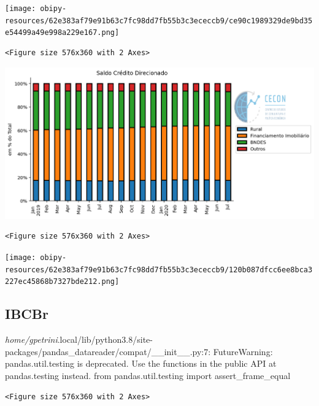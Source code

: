 \documentclass[11pt]{article}
\begin{document}
\begin{enumerate}
\begin{center}
\texttt{[image: obipy-resources/62e383af79e91b63c7fc98dd7fb55b3c3ececcb9/ce90c1989329de9bd35e54499a49e998a229e167.png]}
\end{center}

\begin{verbatim}
<Figure size 576x360 with 2 Axes>
\end{verbatim}


\begin{center}
\includegraphics[width=.9\linewidth]{obipy-resources/62e383af79e91b63c7fc98dd7fb55b3c3ececcb9/9a2b55ba48387fe773ae71f452b084dae90c5a91.png}
\end{center}

\begin{verbatim}
<Figure size 576x360 with 2 Axes>
\end{verbatim}


\begin{center}
\texttt{[image: obipy-resources/62e383af79e91b63c7fc98dd7fb55b3c3ececcb9/120b087dfcc6ee8bca3227ec45868b7327bde212.png]}
\end{center}
\end{enumerate}



\subsection{IBCBr}
\label{sec:org1afa811}

\emph{home/gpetrini}.local/lib/python3.8/site-packages/pandas\_datareader/compat/\_\_init\_\_.py:7: FutureWarning: pandas.util.testing is deprecated. Use the functions in the public API at pandas.testing instead.
  from pandas.util.testing import assert\_frame\_equal


\begin{verbatim}
<Figure size 576x360 with 2 Axes>
\end{verbatim}
\end{document}

